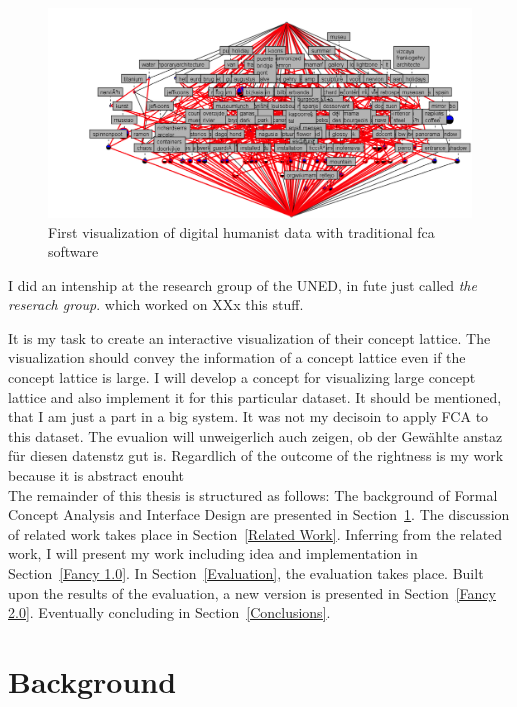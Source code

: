 \documentclass[11pt]{report}
\begin{document}
\begin{figure}[!ht]
	\centering
	\includegraphics[width=\linewidth]{./images/firstVisualization}
\caption{First visualization of digital humanist data with traditional \acrshort{fca} software}
\label{figure:firstVisualizaion}
\end{figure}


I did an intenship at the research group of the UNED, in fute just called \textit{the reserach group}. which worked on XXx this stuff.


It is my task to create an interactive visualization of their concept lattice. The visualization should convey the information of a concept lattice even if the concept lattice is large. I will develop a concept for visualizing large concept lattice and also implement it for this particular dataset. It should be mentioned, that I am just a part in a big system. It was not my decisoin to apply FCA to this dataset. The evualion will unweigerlich auch zeigen, ob der Gewählte anstaz für diesen datenstz gut is. Regardlich of the outcome of the rightness is my work because it is abstract enouht\\


 The remainder of this thesis is structured as follows: The background of Formal Concept Analysis and Interface Design are presented in Section~\ref{Background}. The discussion of related work takes place in Section~\ref{Related Work}. Inferring from the related work, I will present my work including idea and implementation in Section~\ref{Fancy 1.0}. In Section~\ref{Evaluation}, the evaluation takes place. Built upon the results of the evaluation, a new version is presented in Section~\ref{Fancy 2.0}. Eventually concluding in Section~\ref{Conclusions}.
 
\chapter{Background}
\label{Background}
\end{document}
